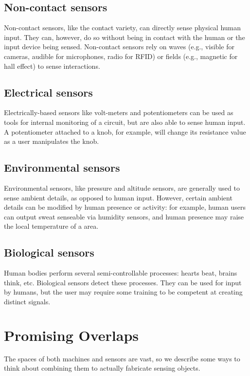 \subsection{Non-contact sensors}

Non-contact sensors, like the contact variety, can directly sense physical human input. They can, however, do so without being in contact with the human or the input device being sensed. Non-contact sensors rely on waves (e.g., visible for cameras, audible for microphones, radio for RFID) or fields (e.g., magnetic for hall effect) to sense interactions. 

\subsection{Electrical sensors}

Electrically-based sensors like volt-meters and potentiometers can be used as tools for internal monitoring of a circuit, but are also able to sense human input. A potentiometer attached to a knob, for example, will change its resistance value as a user manipulates the knob.

\subsection{Environmental sensors}

Environmental sensors, like pressure and altitude sensors, are generally used to sense ambient details, as opposed to human input. However, certain ambient details can be modified by human presence or activity: for example, human users can output sweat senseable via humidity sensors, and human presence may raise the local temperature of a area.

\subsection{Biological sensors}

Human bodies perform several semi-controllable processes: hearts beat, brains think, etc. Biological sensors detect these processes. They can be used for input by humans, but the user may require some training to be competent at creating distinct signals.

\section{Promising Overlaps}

The spaces of both machines and sensors are vast, so we describe some ways to think about combining them to actually fabricate sensing objects.

